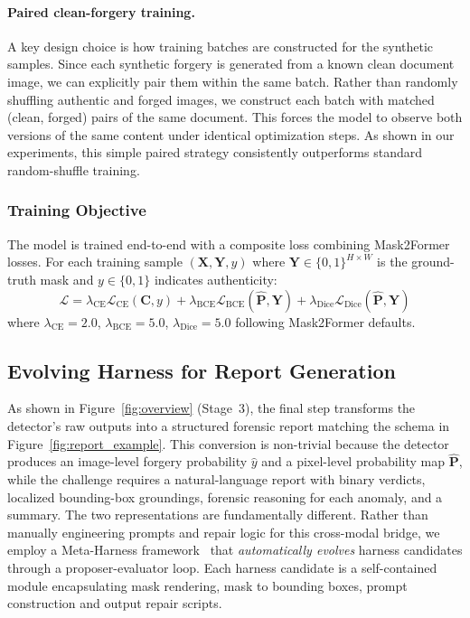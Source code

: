 \documentclass[sigconf, screen, review, anonymous]{acmart}
\begin{document}
\paragraph{Paired clean-forgery training.} A key design choice is how training batches are constructed for the synthetic samples. Since each synthetic forgery is generated from a known clean document image, we can explicitly pair them within the same batch. Rather than randomly shuffling authentic and forged images, we construct each batch with matched (clean, forged) pairs of the same document. This forces the model to observe both versions of the same content under identical optimization steps. As shown in our experiments, this simple paired strategy consistently outperforms standard random-shuffle training.

\subsubsection{Training Objective}

The model is trained end-to-end with a composite loss combining Mask2Former losses. For each training sample $(\mathbf{X}, \mathbf{Y}, y)$ where $\mathbf{Y} \in \{0,1\}^{H \times W}$ is the ground-truth mask and $y \in \{0,1\}$ indicates authenticity:
\begin{equation}
\mathcal{L} = \lambda_{\text{CE}}\mathcal{L}_{\text{CE}}(\mathbf{C}, y) + \lambda_{\text{BCE}}\mathcal{L}_{\text{BCE}}(\hat{\mathbf{P}}, \mathbf{Y}) + \lambda_{\text{Dice}}\mathcal{L}_{\text{Dice}}(\hat{\mathbf{P}}, \mathbf{Y})
\end{equation}
where $\lambda_{\text{CE}} = 2.0$, $\lambda_{\text{BCE}} = 5.0$, $\lambda_{\text{Dice}} = 5.0$ following Mask2Former defaults.

\subsection{Evolving Harness for Report Generation}
\label{sec:harness}

As shown in Figure~\ref{fig:overview} (Stage~3), the final step transforms the detector's raw outputs into a structured forensic report matching the schema in Figure~\ref{fig:report_example}. This conversion is non-trivial because the detector produces an image-level forgery probability $\hat{y}$ and a pixel-level probability map $\hat{\mathbf{P}}$, while the challenge requires a natural-language report with binary verdicts, localized bounding-box groundings, forensic reasoning for each anomaly, and a summary. The two representations are fundamentally different. Rather than manually engineering prompts and repair logic for this cross-modal bridge, we employ a Meta-Harness framework~\cite{meta2025harness} that \emph{automatically evolves} harness candidates through a proposer-evaluator loop. Each harness candidate is a self-contained module encapsulating mask rendering, mask to bounding boxes, prompt construction and output repair scripts.
\end{document}
